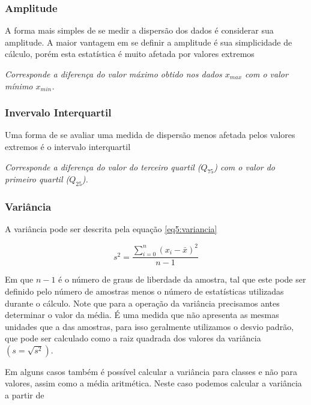 \subsubsection{Amplitude} 

A forma mais simples de se medir a dispersão dos dados é considerar sua amplitude. A maior vantagem em se definir a amplitude é sua simplicidade de cálculo, porém esta estatística é muito afetada por valores extremos

\begin{definition}[Amplitude]
\textit{Corresponde a diferença do valor máximo obtido nos dados $x_{max}$ com o valor mínimo $x_{min}$.} 
\end{definition}

\subsubsection{Invervalo Interquartil} 

Uma forma de se avaliar uma medida de dispersão menos afetada pelos valores extremos é o intervalo interquartil

\begin{definition}
\textit{Corresponde a diferença do valor do terceiro quartil ($Q_{75}$) com o valor do primeiro quartil ($Q_{25}$).} 
\end{definition}

\subsubsection{Variância} 

A variância pode ser descrita pela equação \eqref{eq5:variancia}

\begin{equation}\label{eq5:variancia}
s^2 = \frac{\sum_{i = 0}^{n} \left( x_i - \bar{x} \right)^2}{n-1}
\end{equation}

Em que $n-1$ é o número de graus de liberdade da amostra, tal que este pode ser definido pelo número de amostras menos o número de estatísticas utilizadas durante o cálculo. Note que para a operação da variância precisamos antes determinar o valor da média. É uma medida que não apresenta as mesmas unidades que a das amostras, para isso geralmente utilizamos o desvio padrão, que pode ser calculado como a raiz quadrada dos valores da variância $(s=\sqrt{s^{2}})$. 

Em alguns casos também é possível calcular a variância para classes e não para valores, assim como a média aritmética. Neste caso podemos calcular a variância a partir de 

